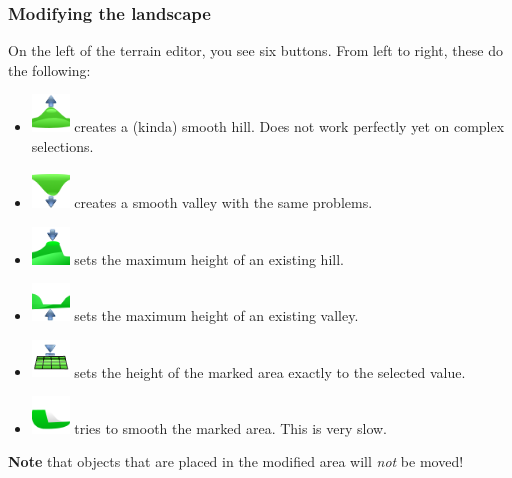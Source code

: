 \documentclass[a4paper]{article}
\newcommand{\note}[1]{\textbf{Note} #1 \par}
\begin{document}
\subsubsection{Modifying the landscape}
On the left of the terrain editor, you see six buttons. From left to right, these do the following:
\begin{itemize}
  \item \includegraphics[width=10mm]{../images/terrain-raise.png} creates a (kinda) smooth hill. Does not work perfectly yet on complex selections.
  \item \includegraphics[width=10mm]{../images/terrain-lower.png} creates a smooth valley with the same problems.
  \item \includegraphics[width=10mm]{../images/terrain-maximum.png} sets the maximum height of an existing hill.
  \item \includegraphics[width=10mm]{../images/terrain-minimum.png} sets the maximum height of an existing valley.
  \item \includegraphics[width=10mm]{../images/terrain-setfix.png} sets the height of the marked area exactly to the selected value.
  \item \includegraphics[width=10mm]{../images/terrain-smooth.png} tries to smooth the marked area. This is very slow.
\end{itemize}
\note{that objects that are placed in the modified area will \emph{not} be moved!}
\end{document}
